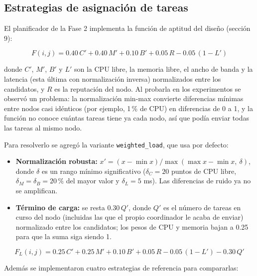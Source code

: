 \subsection{Estrategias de asignación de tareas}

El planificador de la Fase 2 implementa la función de aptitud del diseño (sección 9):

\begin{equation}
F(i,j) = 0.40\,C' + 0.40\,M' + 0.10\,B' + 0.05\,R - 0.05\,(1 - L')
\end{equation}

donde $C'$, $M'$, $B'$ y $L'$ son la CPU libre, la memoria libre, el ancho de banda y la latencia
(esta última con normalización inversa) normalizados entre los candidatos, y $R$ es la reputación del
nodo. Al probarla en los experimentos se observó un problema: la normalización min-max convierte
diferencias mínimas entre nodos casi idénticos (por ejemplo, 1\,\% de CPU) en diferencias de 0 a 1, y
la función no conoce cuántas tareas tiene ya cada nodo, así que podía enviar todas las tareas al mismo
nodo.

Para resolverlo se agregó la variante \texttt{weighted\_load}, que usa por defecto:

\begin{itemize}
\item \textbf{Normalización robusta:} $x' = (x - \min x) / \max(\max x - \min x,\ \delta)$, donde
$\delta$ es un rango mínimo significativo ($\delta_C = 20$ puntos de CPU libre, $\delta_M = \delta_B = 20\,\%$
del mayor valor y $\delta_L = 5$ ms). Las diferencias de ruido ya no se amplifican.
\item \textbf{Término de carga:} se resta $0.30\,Q'$, donde $Q'$ es el número de tareas en curso del
nodo (incluidas las que el propio coordinador le acaba de enviar) normalizado entre los candidatos; los
pesos de CPU y memoria bajan a 0.25 para que la suma siga siendo 1.
\end{itemize}

\begin{equation}
F_{L}(i,j) = 0.25\,C' + 0.25\,M' + 0.10\,B' + 0.05\,R - 0.05\,(1 - L') - 0.30\,Q'
\end{equation}

Además se implementaron cuatro estrategias de referencia para compararlas:

